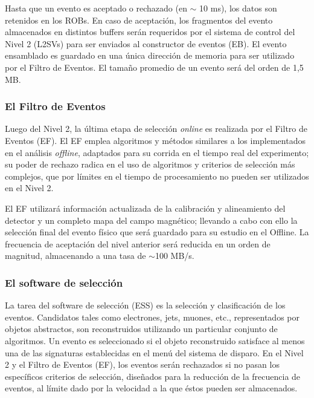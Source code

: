   Hasta que un evento es aceptado o rechazado (en $\sim$ 10 ms), los datos son retenidos en los ROBs. En caso de aceptaci\'on, los fragmentos del evento almacenados en distintos buffers ser\'an requeridos por el sistema de control del Nivel 2 (L2SVs) para ser enviados al constructor de eventos (EB). El evento ensamblado es guardado en una \'unica direcci\'on de memoria para ser utilizado por el Filtro de Eventos. El tama\~no promedio de un evento ser\'a del orden de 1,5 MB.


\subsubsection{El Filtro de Eventos}

  Luego del Nivel 2, la \'ultima etapa de selecci\'on \emph{online} es realizada por el Filtro de Eventos (EF). El EF emplea algoritmos y m\'etodos similares a los implementados en el an\'alisis \emph{offline}, adaptados para su corrida en el tiempo real del experimento; su poder de rechazo radica en el uso de algoritmos y criterios de selecci\'on m\'as complejos, que por l\'imites en el tiempo de procesamiento no pueden ser utilizados en el Nivel 2.
  
  El EF utilizar\'a informaci\'on actualizada de la calibraci\'on y alineamiento del detector y un completo mapa del campo magn\'etico; llevando a cabo con ello la selecci\'on final del evento f\'isico que ser\'a guardado para su estudio en el Offline. La frecuencia de aceptaci\'on del nivel anterior ser\'a reducida en un orden de magnitud, almacenando a una tasa de $\sim$100 MB/s.


\subsubsection{El software de selecci\'on}
\label{'HLTalgos'}
   
 La tarea del software de selecci\'on (ESS) es la selecci\'on y clasificaci\'on de los eventos. Candidatos tales como electrones, jets, muones, etc., representados por objetos abstractos, son reconstruidos utilizando un particular conjunto de algoritmos. Un evento es seleccionado si el objeto reconstruido satisface al menos una de las signaturas establecidas en el men\'u del sistema de disparo. En el Nivel 2 y el Filtro de Eventos (EF), los eventos ser\'an rechazados si no pasan los espec\'ificos criterios de selecci\'on, dise\~nados para la reducci\'on de la frecuencia de eventos, al l\'imite dado por la velocidad a la que \'estos pueden ser almacenados.

